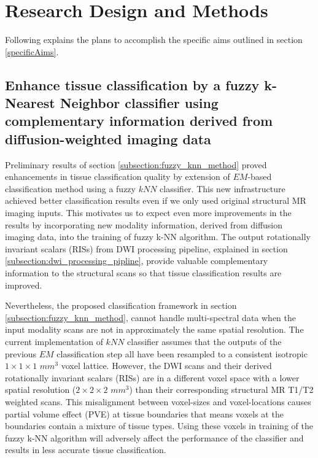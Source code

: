 \section{Research Design and Methods}
Following explains the plans to accomplish the specific aims outlined in section \ref{specificAims}.



\subsection{Enhance tissue classification by a fuzzy k-Nearest Neighbor classifier using complementary information derived from diffusion-weighted imaging data}
\label{researchPlan:classification}
Preliminary results of section \ref{subsection:fuzzy_knn_method} proved enhancements in tissue classification quality by extension of $EM$-based classification method using a fuzzy $kNN$ classifier.
This new infrastructure achieved better classification results even if we only used original structural MR imaging inputs. This motivates us to expect even more improvements in the results by incorporating new modality information, derived from diffusion imaging data, into the training of fuzzy k-NN algorithm. The output rotationally invariant scalars (RISs) from DWI processing pipeline, explained in section \ref{subsection:dwi_processing_pipline}, provide valuable complementary information to the structural scans so that tissue classification results are improved.
\newline

\noindent Nevertheless, the proposed classification framework in section \ref{subsection:fuzzy_knn_method},
cannot handle multi-spectral data when the input modality scans are not in approximately the same spatial resolution. The current implementation of $kNN$ classifier assumes that the outputs of the previous $EM$ classification step all have been resampled to a consistent isotropic $1\times1\times1$ $mm^3$ voxel lattice. However, the DWI scans and their derived rotationally invariant scalars (RISs) are in a different voxel space with a lower spatial resolution ($2\times2\times2$ $mm^3$) than their corresponding structural MR T1/T2 weighted scans. This misalignment between voxel-sizes and voxel-locations causes partial volume effect (PVE) at tissue boundaries
that means voxels at the boundaries contain a mixture of tissue types. Using these voxels in training of the fuzzy k-NN algorithm will adversely affect the performance of the classifier and results in less accurate tissue classification.
\newline

